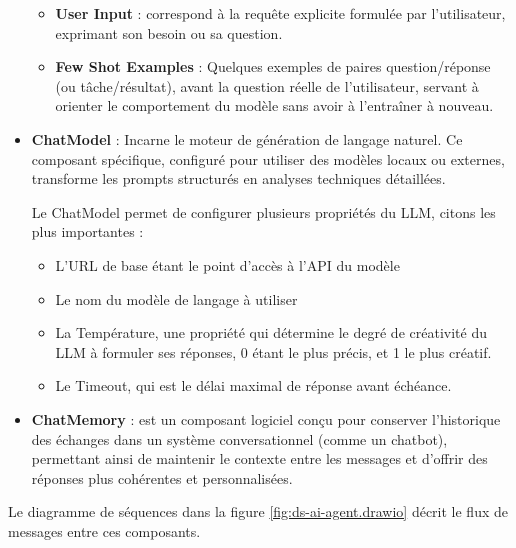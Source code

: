 \documentclass[12pt,a4paper]{report}
\begin{document}
\begin{itemize}
\begin{itemize}
			\item \textbf{User Input} : correspond à la requête explicite formulée par l’utilisateur, exprimant son besoin ou sa question.
			
			\item \textbf{Few Shot Examples} : Quelques exemples de paires question/réponse (ou tâche/résultat), avant la question réelle de l’utilisateur, servant à orienter le comportement du modèle sans avoir à l'entraîner à nouveau.
			
		\end{itemize}
		
		\item \textbf{ChatModel} : Incarne le moteur de génération de langage naturel. Ce composant spécifique, configuré pour utiliser des modèles locaux ou externes, transforme les prompts structurés en analyses techniques détaillées.
		
		Le ChatModel permet de configurer plusieurs propriétés du LLM, citons les plus importantes :
		
		\begin{itemize}
			
			\item L'URL de base étant le point d'accès à l'API du modèle
			
			\item Le nom du modèle de langage à utiliser
			
			\item La Température, une propriété qui détermine le degré de créativité du LLM à formuler ses réponses, 0 étant le plus précis, et 1 le plus créatif.
			
			\item Le Timeout, qui est le délai maximal de réponse avant échéance.
			
		\end{itemize}
		
		\item \textbf{ChatMemory} : est un composant logiciel conçu pour conserver l’historique des échanges dans un système conversationnel (comme un chatbot), permettant ainsi de maintenir le contexte entre les messages et d’offrir des réponses plus cohérentes et personnalisées.
		
	\end{itemize}
	
	Le diagramme de séquences dans la figure \ref{fig:ds-ai-agent.drawio} décrit le flux de messages entre ces composants.
	
\end{document}
